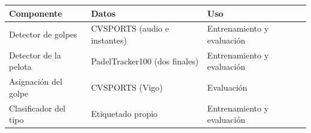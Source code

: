 \begin{tabular}{p{3.8cm}p{5.4cm}p{4.8cm}}
\toprule
\textbf{Componente} & \textbf{Datos} & \textbf{Uso} \\
\midrule
Detector de golpes & CVSPORTS (audio e instantes) & Entrenamiento y evaluación \\
Detector de la pelota & PadelTracker100 (dos finales) & Entrenamiento y evaluación \\
Asignación del golpe & CVSPORTS (Vigo) & Evaluación \\
Clasificador del tipo & Etiquetado propio & Entrenamiento y evaluación \\
\bottomrule
\end{tabular}
